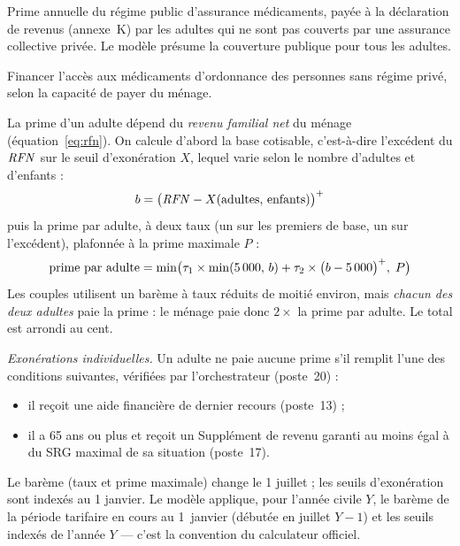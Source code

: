 
\pdesc Prime annuelle du régime public d'assurance médicaments, payée à la
déclaration de revenus (annexe~K) par les adultes qui ne sont pas couverts
par une assurance collective privée. Le modèle présume la couverture
publique pour tous les adultes.

\pobj Financer l'accès aux médicaments d'ordonnance des personnes sans
régime privé, selon la capacité de payer du ménage.

\pregle La prime d'un adulte dépend du \emph{revenu familial net} du ménage
(équation~\ref{eq:rfn}). On calcule d'abord la base cotisable, c'est-à-dire
l'excédent du $\mathit{RFN}$ sur le seuil d'exonération $X$, lequel varie selon le
nombre d'adultes et d'enfants :
\[
b = \bigl(\mathit{RFN} - X(\text{adultes},\, \text{enfants})\bigr)^{+}
\]
puis la prime par adulte, à deux taux (un sur les premiers  de base,
un sur l'excédent), plafonnée à la prime maximale $P$ :
\[
\text{prime par adulte} = \min\bigl(\tau_1 \times \min(5\,000,\, b)
 + \tau_2 \times \bigl(b - 5\,000\bigr)^{+},\; P\bigr)
\]
Les couples utilisent un barème à taux réduits de moitié environ, mais
\emph{chacun des deux adultes} paie la prime : le ménage paie donc
$2 \times$ la prime par adulte. Le total est arrondi au cent.

\emph{Exonérations individuelles.} Un adulte ne paie aucune prime s'il
remplit l'une des conditions suivantes, vérifiées par l'orchestrateur
(poste~20) :
\begin{itemize}
  \item il reçoit une aide financière de dernier recours (poste~13) ;
  \item il a 65 ans ou plus et reçoit un Supplément de revenu garanti au
        moins égal à  du SRG maximal de sa situation (poste~17).
\end{itemize}

\pparams Le barème (taux et prime maximale) change le 1\ier{} juillet ; les
seuils d'exonération sont indexés au 1\ier{} janvier. Le modèle applique,
pour l'année civile $Y$, le barème de la période tarifaire en cours au
1\ier{}~janvier (débutée en juillet $Y{-}1$) et les seuils indexés de
l'année $Y$ --- c'est la convention du calculateur officiel.

